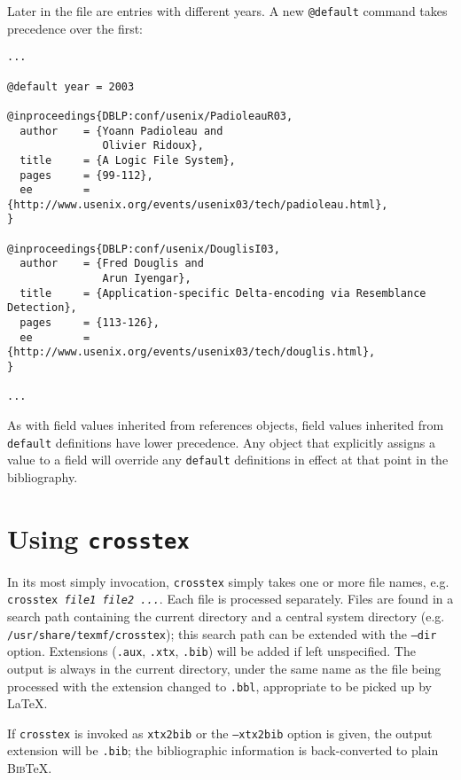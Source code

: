 \documentclass{article}
\newcommand{\BibTeX}{\textsc{Bib}\TeX}
\begin{document}
Later in the file are entries with different years. A new \texttt{@default} command takes precedence over the first:

\begin{small}\begin{verbatim}
...

@default year = 2003

@inproceedings{DBLP:conf/usenix/PadioleauR03,
  author    = {Yoann Padioleau and
               Olivier Ridoux},
  title     = {A Logic File System},
  pages     = {99-112},
  ee        = {http://www.usenix.org/events/usenix03/tech/padioleau.html},
}

@inproceedings{DBLP:conf/usenix/DouglisI03,
  author    = {Fred Douglis and
               Arun Iyengar},
  title     = {Application-specific Delta-encoding via Resemblance Detection},
  pages     = {113-126},
  ee        = {http://www.usenix.org/events/usenix03/tech/douglis.html},
}

...
\end{verbatim}\end{small}

As with field values inherited from references objects, field values
inherited from \texttt{default} definitions have lower precedence. Any
object that explicitly assigns a value to a field will override any 
\texttt{default} definitions in effect at that point in the bibliography.



\section{Using \texttt{crosstex}}

In its most simply invocation, \texttt{crosstex} simply takes one or more file names, e.g. \texttt{crosstex \textrm{\textit{file1 file2 ...}}}. Each file is processed separately. Files are found in a search path containing the current directory and a central system directory (e.g. \texttt{/usr/share/texmf/crosstex}); this search path can be extended with the \texttt{--dir} option. Extensions (\texttt{.aux}, \texttt{.xtx}, \texttt{.bib}) will be added if left unspecified. The output is always in the current directory, under the same name as the file being processed with the extension changed to \texttt{.bbl}, appropriate to be picked up by \LaTeX{}.

If \texttt{crosstex} is invoked as \texttt{xtx2bib} or the \texttt{--xtx2bib} option is given, the output extension will be \texttt{.bib}; the bibliographic information is back-converted to plain \BibTeX{}.
\end{document}
